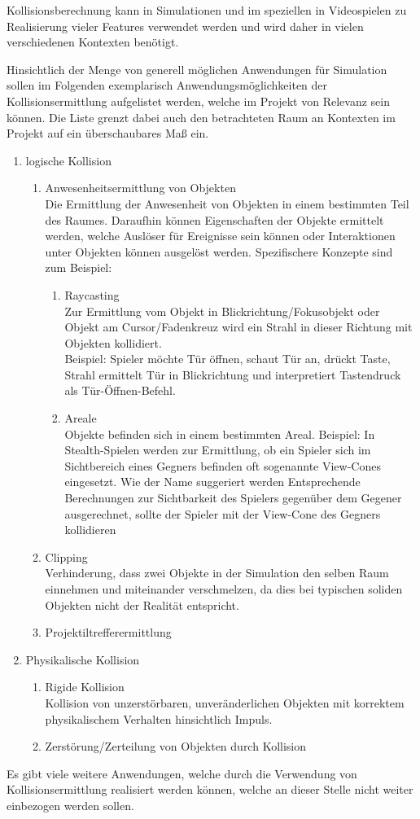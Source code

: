 Kollisionsberechnung kann in Simulationen und im speziellen in Videospielen zu Realisierung vieler Features verwendet werden und wird daher in vielen verschiedenen Kontexten benötigt. 

Hinsichtlich der Menge von generell möglichen Anwendungen für Simulation sollen im Folgenden exemplarisch Anwendungsmöglichkeiten der Kollisionsermittlung aufgelistet werden, welche im Projekt von Relevanz sein können. Die Liste grenzt dabei auch den betrachteten Raum an Kontexten im Projekt auf ein überschaubares Maß ein. 

\begin{enumerate}
	\item logische Kollision\\
	\begin{enumerate}
		\item Anwesenheitsermittlung von Objekten\\
	Die Ermittlung der Anwesenheit von Objekten in einem bestimmten Teil des Raumes. Daraufhin können Eigenschaften der Objekte ermittelt werden, welche Auslöser für Ereignisse sein können oder Interaktionen unter Objekten können ausgelöst werden. Spezifischere Konzepte sind zum Beispiel: 
		\begin{enumerate}
			\item Raycasting\\
	Zur Ermittlung vom Objekt in Blickrichtung/Fokusobjekt oder Objekt am Cursor/Fadenkreuz wird ein Strahl in dieser Richtung mit Objekten kollidiert.\\
	Beispiel: Spieler möchte Tür öffnen, schaut Tür an, drückt Taste, Strahl ermittelt Tür in Blickrichtung und interpretiert Tastendruck als Tür-Öffnen-Befehl.
			\item Areale\\
	Objekte befinden sich in einem bestimmten Areal.
	Beispiel: In Stealth-Spielen werden zur Ermittlung, ob ein  Spieler sich im Sichtbereich eines Gegners befinden oft sogenannte View-Cones eingesetzt. Wie der Name suggeriert werden Entsprechende Berechnungen zur Sichtbarkeit des Spielers gegenüber dem Gegener ausgerechnet, sollte der Spieler mit der View-Cone des Gegners kollidieren
		\end{enumerate}
		\item Clipping\\
	Verhinderung, dass zwei Objekte in der Simulation den selben Raum einnehmen und miteinander verschmelzen, da dies bei typischen soliden Objekten nicht der Realität entspricht.
		\item Projektiltrefferermittlung
	\end{enumerate}

	\item Physikalische Kollision
		\begin{enumerate}
			\item Rigide Kollision\\
		Kollision von unzerstörbaren, unveränderlichen Objekten mit korrektem physikalischem Verhalten hinsichtlich Impuls.
			\item Zerstörung/Zerteilung von Objekten durch Kollision
		\end{enumerate}
\end{enumerate}

Es gibt viele weitere Anwendungen, welche durch die Verwendung von Kollisionsermittlung realisiert werden können, welche an dieser Stelle nicht weiter einbezogen werden sollen.

